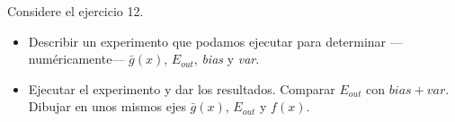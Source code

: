 \documentclass[a4paper, 11pt]{article}
\begin{document}
    \begin{bonus}
        Considere el ejercicio 12.
        \begin{itemize}
            \item Describir un experimento que podamos ejecutar para determinar ---numéricamente--- $\bar{g}(x)$, $E_{out}$, \emph{bias} y \emph{var}.
            \item Ejecutar el experimento y dar los resultados. Comparar $E_{out}$ con $bias+var$. Dibujar en unos mismos ejes $\bar{g}(x)$, $E_{out}$ y $f(x)$.
        \end{itemize}
    \end{bonus}

    \nocite{*}



\end{document}
